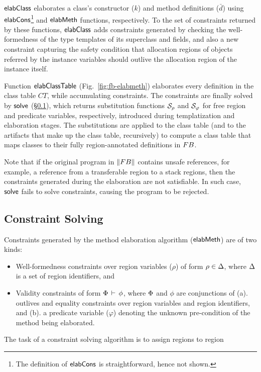 ${\sf elabClass}$ elaborates a class's constructor ($k$) and method
definitions ($\bar{d}$) using ${\sf elabCons}$\footnote{The definition of
${\sf elabCons}$ is straightforward, hence not shown.} and ${\sf elabMeth}$
functions, respectively. To the set of constraints returned by these
functions, ${\sf elabClass}$ adds constraints generated by checking the
well-formedness of the type templates of its superclass and fields,
and also a new constraint capturing the safety condition that
allocation regions of objects referred by the instance variables
should outlive the allocation region of the instance itself.

Function ${\sf elabClassTable}$ (Fig.~\ref{fig:fb-elabmeth}) elaborates
every definition in the class table $CT$, while accumulating
constraints. The constraints are finally solved by ${\sf solve}$
(\S\ref{sec:fb-constraintsolving}), which returns substitution
functions $\mathcal{S}_\rho$ and $\mathcal{S}_\varphi$ for free region and
predicate variables, respectively, introduced during templatization
and elaboration stages. The substitutions are applied to the class
table (and to the artifacts that make up the class table, recursively)
to compute a class table that maps classes to their fully
region-annotated definitions in ${\sc FB}$.

Note that if the original program in $\left\| {\sc FB} \right\|$ contains unsafe
references, for example, a reference from a transferable region to a
stack regions, then the constraints generated during the elaboration
are not satisfiable. In such case, ${\sf solve}$ fails to solve
constraints, causing the program to be rejected.

\subsection{Constraint Solving}
\label{sec:fb-constraintsolving}

Constraints generated by the method elaboration algorithm
(${\sf elabMeth}$) are of two kinds: 
\begin{itemize}
\item Well-formedness constraints over region variables ($\rho$) of
form $\rho \in \Delta$, where $\Delta$ is a set of region
identifiers, and 
\item Validity constraints of form $\Phi\,\vdash\,\phi$, where
$\Phi$ and $\phi$ are conjunctions of (a). outlives and equality
constraints over region variables and region identifiers, and (b).
a predicate variable ($\varphi$) denoting the unknown pre-condition
of the method being elaborated.
\end{itemize}
\noindent The task of a constraint solving algorithm is to assign
regions to region
